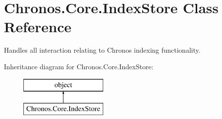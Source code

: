 \hypertarget{classChronos_1_1Core_1_1IndexStore}{}\section{Chronos.\+Core.\+Index\+Store Class Reference}
\label{classChronos_1_1Core_1_1IndexStore}


Handles all interaction relating to Chronos indexing functionality.  


Inheritance diagram for Chronos.\+Core.\+Index\+Store\+:\begin{figure}[H]
\begin{center}
\leavevmode
\includegraphics[height=2.000000cm]{classChronos_1_1Core_1_1IndexStore}
\end{center}
\end{figure}
